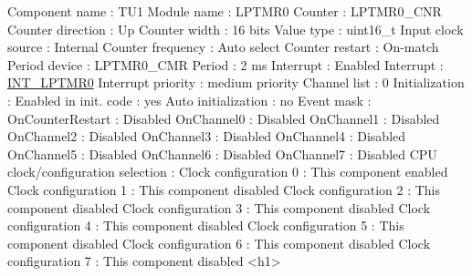 \begin{DoxyCode}
            Component name                                 : TU1
            Module name                                    : LPTMR0
            Counter                                        : LPTMR0\_CNR
            Counter direction                              : Up
            Counter width                                  : 16 bits
            Value type                                     : uint16\_t
            Input clock source                             : Internal
              Counter frequency                            : Auto select
            Counter restart                                : On-match
              Period device                                : LPTMR0\_CMR
              Period                                       : 2 ms
              Interrupt                                    : Enabled
                Interrupt                                  : \hyperlink{group___interrupt__vector__numbers_gga5f3656e2a154b64aa378a2f3856c3a8dadb33151c23fc4df6fa87f60d1df02dae}{INT\_LPTMR0}
                Interrupt priority                         : medium priority
            Channel list                                   : 0
            Initialization                                 : 
              Enabled in init. code                        : yes
              Auto initialization                          : no
              Event mask                                   : 
                OnCounterRestart                           : Disabled
                OnChannel0                                 : Disabled
                OnChannel1                                 : Disabled
                OnChannel2                                 : Disabled
                OnChannel3                                 : Disabled
                OnChannel4                                 : Disabled
                OnChannel5                                 : Disabled
                OnChannel6                                 : Disabled
                OnChannel7                                 : Disabled
            CPU clock/configuration selection              : 
              Clock configuration 0                        : This component enabled
              Clock configuration 1                        : This component disabled
              Clock configuration 2                        : This component disabled
              Clock configuration 3                        : This component disabled
              Clock configuration 4                        : This component disabled
              Clock configuration 5                        : This component disabled
              Clock configuration 6                        : This component disabled
              Clock configuration 7                        : This component disabled
<h1>
\end{DoxyCode}
